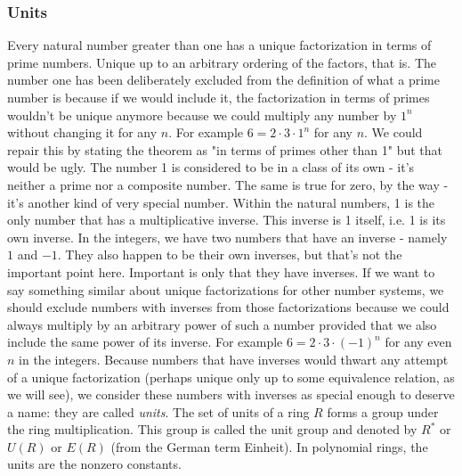 \subsubsection{Units}
Every natural number greater than one has a unique factorization in terms of prime numbers. Unique up to an arbitrary ordering of the factors, that is. The number one has been deliberately excluded from the definition of what a prime number is because if we would include it, the factorization in terms of primes wouldn't be unique anymore because we could multiply any number by $1^n$ without changing it for any $n$. For example $6 = 2 \cdot 3 \cdot 1^n$ for any $n$. We could repair this by stating the theorem as "in terms of primes other than 1" but that would be ugly. The number 1 is considered to be in a class of its own - it's neither a prime nor a composite number. The same is true for zero, by the way - it's another kind of very special number. Within the natural numbers, 1 is the only number that has a multiplicative inverse. This inverse is 1 itself, i.e. 1 is its own inverse. In the integers, we have two numbers that have an inverse - namely $1$ and $-1$. They also happen to be their own inverses, but that's not the important point here. Important is only that they have inverses. If we want to say something similar about unique factorizations for other number systems, we should exclude numbers with inverses from those factorizations because we could always multiply by an arbitrary power of such a number provided that we also include the same power of its inverse. For example $6 = 2 \cdot 3 \cdot (-1)^n$ for any even $n$ in the integers. Because numbers that have inverses would thwart any attempt of a unique factorization (perhaps unique only up to some equivalence relation, as we will see), we consider these numbers with inverses as special enough to deserve a name: they are called \emph{units}. The set of units of a ring $R$ forms a group under the ring multiplication. This group is called the unit group and denoted by $R^*$ or $U(R)$ or $E(R)$ (from the German term Einheit). In polynomial rings, the units are the nonzero constants. 


%



